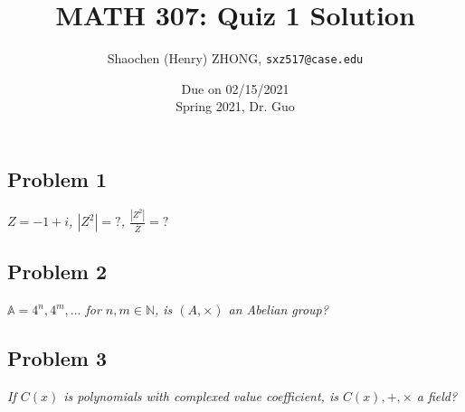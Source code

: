 \documentclass[11pt]{article}
\newcommand{\ilc}{\texttt}
\begin{document}
\title{\textbf{MATH 307: Quiz 1 Solution}}


\author{
Shaochen (Henry) ZHONG, \ilc{sxz517@case.edu}}

\date{Due on 02/15/2021 \\ Spring 2021, Dr. Guo}
\maketitle




\subsection*{Problem 1}
\textit{$Z = -1 + i$, $|Z^2| = ?$, $\frac{|Z^2|}{\overline{Z}} = ?$}\newline


\subsection*{Problem 2}
\textit{$\mathbb{A} = 4^n, 4^m, ...$ for $n, m \in \mathbb{N}$, is $(A, \times)$ an Abelian group?}\newline

\subsection*{Problem 3}
\textit{If $C(x)$ is polynomials with complexed value coefficient, is $C(x), +, \times$ a field?}\newline
\end{document}

